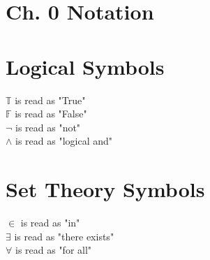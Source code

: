 \documentclass[11pt]{article}
\begin{document}
\section*{Ch. 0 Notation}



\section{Logical Symbols}
$\mathbb{T}$ is read as "True"\\
$\mathbb{F}$ is read as "False"\\
$\lnot$ is read as "not"\\
$\land$ is read as "logical and"



\section{Set Theory Symbols}
$\in$ is read as "in"\\
$\exists$ is read as "there exists"\\
$\forall$ is read as "for all"
\end{document}
